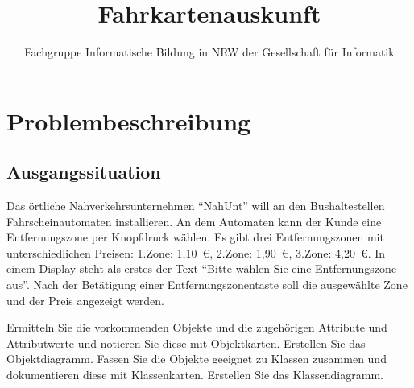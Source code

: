 \documentclass[12pt,a4paper]{scrartcl}
\author{Fachgruppe Informatische Bildung in NRW der Gesellschaft für Informatik}
\title{Fahrkartenauskunft}
\begin{document}
    \section*{Problembeschreibung}
    \subsection*{Ausgangssituation}
        Das örtliche Nahverkehrsunternehmen \enquote{NahUnt} will an den Bushaltestellen Fahrscheinautomaten installieren. An dem Automaten kann der Kunde eine Entfernungszone per Knopfdruck wählen. Es gibt drei Entfernungszonen mit unterschiedlichen Preisen: 1.Zone: 1,10~\euro, 2.Zone: 1,90~\euro, 3.Zone: 4,20~\euro. In einem Display steht als erstes der Text \enquote{Bitte wählen Sie eine Entfernungszone aus}. Nach der Betätigung einer Entfernungszonentaste soll die ausgewählte Zone und der Preis angezeigt werden.
        \begin{aufgabe}
            \begin{teilaufgaben}
                \teilaufgabe Ermitteln Sie die vorkommenden Objekte und die zugehörigen Attribute und Attributwerte und notieren Sie diese mit Objektkarten.
                \teilaufgabe Erstellen Sie das Objektdiagramm.
                \teilaufgabe Fassen Sie die Objekte geeignet zu Klassen zusammen und dokumentieren diese mit  Klassenkarten.
                \teilaufgabe Erstellen Sie das Klassendiagramm.
            \end{teilaufgaben}
        \end{aufgabe}
\end{document}
